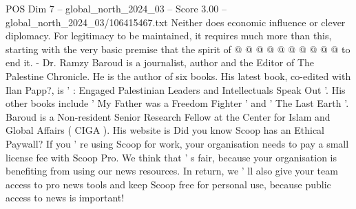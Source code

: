 \begin{textsample}{POS Dim 7 – global\_north\_2024\_03 – Score 3.00 – global\_north\_2024\_03/106415467.txt}
Neither does economic influence or clever diplomacy.
For legitimacy to be maintained, it requires much more than this, starting with the very basic premise that the spirit of @ @ @ @ @ @ @ @ @ @ to end it. - Dr.
Ramzy Baroud is a journalist, author and the Editor of The Palestine Chronicle.
He is the author of six books.
His latest book, co-edited with Ilan Papp?, is ' : Engaged Palestinian Leaders and Intellectuals Speak Out '.
His other books include ' My Father was a Freedom Fighter ' and ' The Last Earth '.
Baroud is a Non-resident Senior Research Fellow at the Center for Islam and Global Affairs ( CIGA ).
His website is Did you know Scoop has an Ethical Paywall?
If you ' re using Scoop for work, your organisation needs to pay a small license fee with Scoop Pro.
We think that ' s fair, because your organisation is benefiting from using our news resources.
In return, we ' ll also give your team access to pro news tools and keep Scoop free for personal use, because public access to news is important!

\end{textsample}
